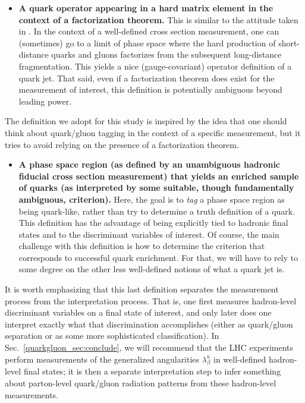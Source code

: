\documentclass[11pt]{cernrep}
\begin{document}
\begin{itemize}
\item \textbf{A quark operator appearing in a hard matrix element in the context of a factorization theorem.}  This is similar to the attitude taken in \cite{Gallicchio:2011xc}.  In the context of a well-defined cross section measurement, one can (sometimes) go to a limit of phase space where the hard production of short-distance quarks and gluons factorizes from the subsequent long-distance fragmentation.  This yields a nice (gauge-covariant) operator definition of a quark jet.  That said, even if a factorization theorem does exist for the measurement of interest, this definition is potentially ambiguous beyond leading power.
\end{itemize}
The definition we adopt for this study is inspired by the idea that one should think about quark/gluon tagging in the context of a specific measurement, but it tries to avoid relying on the presence of a factorization theorem.
\begin{itemize}
\item \textbf{A phase space region (as defined by an unambiguous hadronic fiducial cross section measurement) that yields an enriched sample of quarks (as interpreted by some suitable, though fundamentally ambiguous, criterion).}  Here, the goal is to \emph{tag} a phase space region as being quark-like, rather than try to determine a truth definition of a quark.  This definition has the advantage of being explicitly tied to hadronic final states and to the discriminant variables of interest.   Of course, the main challenge with this definition is how to determine the criterion that corresponds to successful quark enrichment.  For that, we will have to rely to some degree on the other less well-defined notions of what a quark jet is.
\end{itemize}  

It is worth emphasizing that this last definition separates the measurement process from the interpretation process.  That is, one first measures hadron-level discriminant variables on a final state of interest, and only later does one interpret exactly what that discrimination accomplishes (either as quark/gluon separation or as some more sophisticated classification).  In Sec.~\ref{quarkgluon_sec:conclude}, we will recommend that the LHC experiments perform measurements of the generalized angularities $\lambda_\beta^\kappa$ in well-defined hadron-level final states; it is then a separate interpretation step to infer something about parton-level quark/gluon radiation patterns from these hadron-level measurements.
\end{document}
